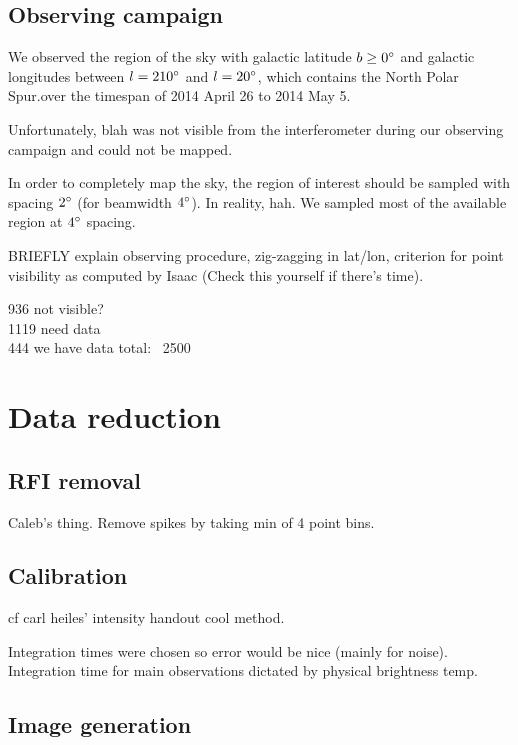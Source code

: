 \documentclass[10pt]{article}
\begin{document}
\subsection{Observing campaign}

We observed the region of the sky with galactic latitude $b\geq 0\degree$ and galactic longitudes between $l=210\degree$ and $l=20\degree$, which contains the North Polar Spur.over the timespan of 2014 April 26 to 2014 May 5.

Unfortunately, blah was not visible from the interferometer during our observing campaign and could not be mapped.

In order to completely map the sky, the region of interest should be sampled with spacing $2\degree$ (for beamwidth $4\degree$).  In reality, hah.  We sampled most of the available region at $4\degree$ spacing.

BRIEFLY explain observing procedure, zig-zagging in lat/lon, criterion for point visibility as computed by Isaac (Check this yourself if there's time).

936 not visible?\\
1119 need data\\
444 we have data
total: ~2500

\section{Data reduction}

\subsection{RFI removal}

Caleb's thing.  Remove spikes by taking min of 4 point bins.

\subsection{Calibration}

cf carl heiles' intensity handout
cool method.

Integration times were chosen so error would be nice (mainly for noise).  Integration time for main observations dictated by physical brightness temp.

\subsection{Image generation}
\end{document}

